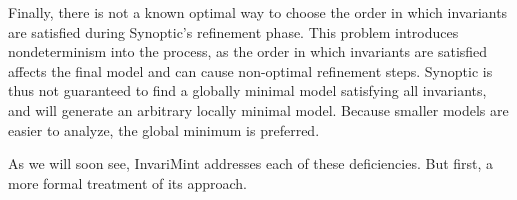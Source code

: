 Finally, there is not a known optimal way to choose the order in which
invariants are satisfied during Synoptic's refinement phase. This problem
introduces nondeterminism into the process, as the order in which invariants are
satisfied affects the final model and can cause non-optimal refinement
steps. Synoptic is thus not guaranteed to find a globally minimal 
model satisfying all invariants, and will generate an arbitrary locally minimal
model. Because smaller models are easier to analyze,
the global minimum is preferred. 

As we will soon see, InvariMint addresses each of these deficiencies. But first, a
more formal treatment of its approach.
